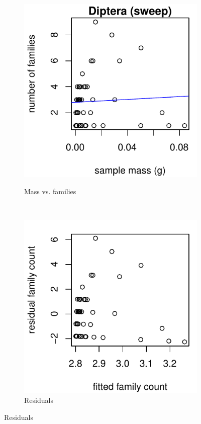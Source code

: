 \documentclass[10pt,letterpaper,twocolumn]{article}
\begin{document}
\begin{figure}[h]
	\centering
	\begin{subfigure}[b]{0.15\textwidth}
		\caption{Mass vs. families}
		\includegraphics[width=\textwidth]{plots/mass-vs-count/scatter/2015_sweep_Diptera_mass-vs-count.pdf}
		\label{fig:sweep_diptera_scatter}
	\end{subfigure}
	~
	\begin{subfigure}[b]{0.15\textwidth}
		\caption{Residuals}
		\includegraphics[width=\textwidth]{plots/mass-vs-count/residual/2015_sweep_Diptera_residual.pdf}

\end{subfigure}
\end{figure}
\end{document}
